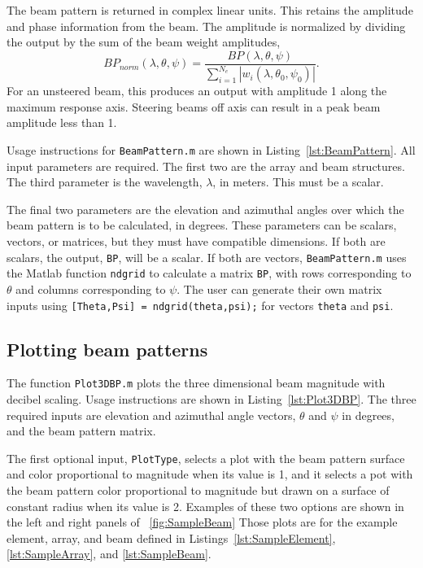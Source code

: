 The beam pattern is returned in complex linear units. This retains the amplitude and phase information from the beam. The amplitude is normalized by dividing the output by the sum of the beam weight amplitudes,
\begin{equation}
BP_{norm}(\lambda,\theta,\psi) = \frac{BP(\lambda,\theta,\psi)}{\sum_{i=1}^{N_e}|w_i(\lambda,\theta_0,\psi_0)|}.
\end{equation}
For an unsteered beam, this produces an output with amplitude 1 along the maximum response axis. Steering beams off axis can result in a peak beam amplitude less than 1.

Usage instructions for \texttt{BeamPattern.m} are shown in Listing~\ref{lst:BeamPattern}. All input parameters are required. The first two are the array and beam structures. The third parameter is the wavelength, $\lambda$, in meters. This must be a scalar. 

The final two parameters are the elevation and azimuthal angles over which the beam pattern is to be calculated, in degrees. These parameters can be scalars, vectors, or matrices, but they must have compatible dimensions. If both are scalars, the output, \texttt{BP}, will be a scalar. If both are vectors, \texttt{BeamPattern.m} uses the Matlab function \texttt{ndgrid} to calculate a matrix \texttt{BP}, with rows corresponding to $\theta$ and columns corresponding to $\psi$. The user can generate their own matrix inputs using \texttt{[Theta,Psi] = ndgrid(theta,psi);} for vectors \texttt{theta} and \texttt{psi}.



\subsection{Plotting beam patterns}

The function \texttt{Plot3DBP.m} plots the three dimensional beam magnitude with decibel scaling. Usage instructions are shown in Listing~\ref{lst:Plot3DBP}. The three required inputs are elevation and azimuthal angle vectors, $\theta$ and $\psi$ in degrees, and the beam pattern matrix. 

The first optional input, \texttt{PlotType}, selects a plot with the beam pattern surface and color proportional to magnitude when its value is 1, and it selects a pot with the beam pattern color proportional to magnitude but drawn on a surface of constant radius when its value is 2. Examples of these two options are shown in the left and right panels of \figname~\ref{fig:SampleBeam} Those plots are for the example element, array, and beam defined in Listings~\ref{lst:SampleElement}, \ref{lst:SampleArray}, and \ref{lst:SampleBeam}.

